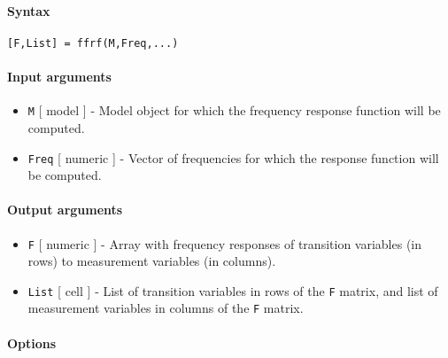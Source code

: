 


	\paragraph{Syntax}

\begin{verbatim}
[F,List] = ffrf(M,Freq,...)
\end{verbatim}

\paragraph{Input arguments}

\begin{itemize}
\item
  \texttt{M} {[} model {]} - Model object for which the frequency
  response function will be computed.
\item
  \texttt{Freq} {[} numeric {]} - Vector of frequencies for which the
  response function will be computed.
\end{itemize}

\paragraph{Output arguments}

\begin{itemize}
\item
  \texttt{F} {[} numeric {]} - Array with frequency responses of
  transition variables (in rows) to measurement variables (in columns).
\item
  \texttt{List} {[} cell {]} - List of transition variables in rows of
  the \texttt{F} matrix, and list of measurement variables in columns of
  the \texttt{F} matrix.
\end{itemize}

\paragraph{Options}

